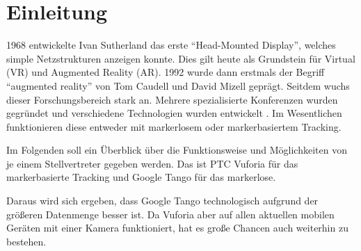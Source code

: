 
\section{Einleitung}

1968 entwickelte Ivan Sutherland das erste "`Head-Mounted Display"', welches simple Netzstrukturen anzeigen konnte. Dies gilt heute als Grundstein für Virtual (VR) und Augmented Reality (AR). 1992 wurde dann erstmals der Begriff "`augmented reality"' von Tom Caudell und David Mizell geprägt. Seitdem wuchs dieser Forschungsbereich stark an. Mehrere spezialisierte Konferenzen wurden gegründet und verschiedene Technologien wurden entwickelt \cite{ar_history}. Im Wesentlichen funktionieren diese entweder mit markerlosem oder markerbasiertem Tracking.\par
Im Folgenden soll ein Überblick über die Funktionsweise und Möglichkeiten von je einem Stellvertreter gegeben werden. Das ist PTC Vuforia für das markerbasierte Tracking und Google Tango für das markerlose.\par
Daraus wird sich ergeben, dass Google Tango technologisch aufgrund der größeren Datenmenge besser ist. Da Vuforia aber auf allen aktuellen mobilen Geräten mit einer Kamera funktioniert, hat es große Chancen auch weiterhin zu bestehen.